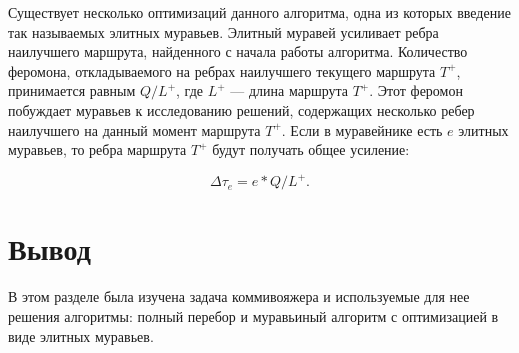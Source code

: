 Существует несколько оптимизаций данного алгоритма, одна из которых введение так называемых элитных муравьев. Элитный муравей усиливает ребра наилучшего маршрута, найденного с начала работы алгоритма. Количество феромона, откладываемого на ребрах наилучшего текущего
маршрута $T^+$, принимается равным $Q/L^+$, где $L^+$ — длина маршрута $T^+$. Этот феромон побуждает муравьев к исследованию решений, содержащих несколько ребер наилучшего на данный момент маршрута $T^+$. Если в муравейнике есть $e$ элитных муравьев, то ребра маршрута $T^+$ будут получать общее усиление:

\begin{equation}
	\label{opt}
	\Delta \tau_{e} = e * Q/L^+.
\end{equation}

\section*{\hsp Вывод}

В этом разделе была изучена задача коммивояжера и используемые для нее решения алгоритмы: полный перебор и муравьиный алгоритм с оптимизацией в виде элитных муравьев.
